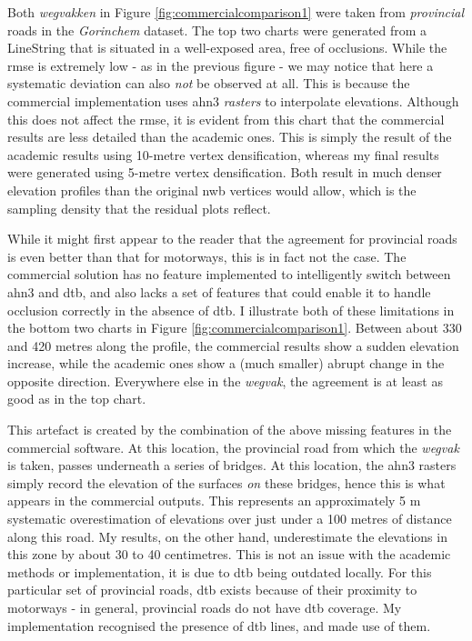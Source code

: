 Both \textit{wegvakken} in Figure \ref{fig:commercialcomparison1} were taken from \textit{provincial} roads in the \textit{Gorinchem} dataset. The top two charts were generated from a LineString that is situated in a well-exposed area, free of occlusions. While the \ac{rmse} is extremely low - as in the previous figure - we may notice that here a systematic deviation can also \textit{not} be observed at all. This is because the commercial implementation uses \ac{ahn3} \textit{rasters} to interpolate elevations. Although this does not affect the \ac{rmse}, it is evident from this chart that the commercial results are less detailed than the academic ones. This is simply the result of the academic results using 10-metre vertex densification, whereas my final results were generated using 5-metre vertex densification. Both result in much denser elevation profiles than the original \ac{nwb} vertices would allow, which is the sampling density that the residual plots reflect.

While it might first appear to the reader that the agreement for provincial roads is even better than that for motorways, this is in fact not the case. The commercial solution has no feature implemented to intelligently switch between \ac{ahn3} and \ac{dtb}, and also lacks a set of features that could enable it to handle occlusion correctly in the absence of \ac{dtb}. I illustrate both of these limitations in the bottom two charts in Figure \ref{fig:commercialcomparison1}. Between about 330 and 420 metres along the profile, the commercial results show a sudden elevation increase, while the academic ones show a (much smaller) abrupt change in the opposite direction. Everywhere else in the \textit{wegvak}, the agreement is at least as good as in the top chart.

This artefact is created by the combination of the above missing features in the commercial software. At this location, the provincial road from which the \textit{wegvak} is taken, passes underneath a series of bridges. At this location, the \ac{ahn3} rasters simply record the elevation of the surfaces \textit{on} these bridges, hence this is what appears in the commercial outputs. This represents an approximately 5 m systematic overestimation of elevations over just under a 100 metres of distance along this road. My results, on the other hand, underestimate the elevations in this zone by about 30 to 40 centimetres. This is not an issue with the academic methods or implementation, it is due to \ac{dtb} being outdated locally. For this particular set of provincial roads, \ac{dtb} exists because of their proximity to motorways - in general, provincial roads do not have \ac{dtb} coverage. My implementation recognised the presence of \ac{dtb} lines, and made use of them.

